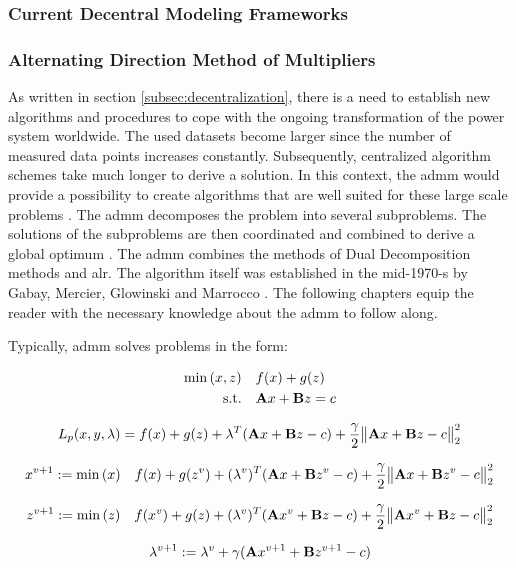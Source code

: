 \subsubsection{Current Decentral Modeling Frameworks}

\subsubsection{Alternating Direction Method of Multipliers}
As written in section \ref{subsec:decentralization}, there is a need to establish new algorithms and procedures to cope with the ongoing transformation of the power system worldwide. The used datasets become larger since the number of measured data points increases constantly. Subsequently, centralized algorithm schemes take much longer to derive a solution. In this context, the \gls{admm} would provide a possibility to create algorithms that are well suited for these large scale problems \citep{boyd2010}. The \gls{admm} decomposes the problem into several subproblems. The solutions of the subproblems are then coordinated and combined to derive a global optimum \citep{boyd2010}. The \gls{admm} combines the methods of Dual Decomposition methods and \gls{alr}. The algorithm itself was established in the mid-1970-s by Gabay, Mercier, Glowinski and Marrocco \citep{boyd2010}. The following chapters equip the reader with the necessary knowledge about the \gls{admm} to follow along.

Typically, \gls{admm} solves problems in the form:

\begin{subequations}
	\begin{align}
		\min{(x, z)} \quad & f(x) + g(z) \\
		\text{s.t.} \quad & \vb{A}x + \vb{B}z = c
	\end{align}
\end{subequations}

\begin{equation}
	L_p(x,y, \lambda) = f(x) + g(z) + \lambda^T(\vb{A}x + \vb{B}z - c) + \frac{\gamma}{2}\big\| \vb{A}x + \vb{B}z - c \big\|^2_2 
\end{equation}


\begin{equation}
	x^{v+1} := \min{(x)} \quad f(x) + g(z^{v}) + (\lambda^v)^T(\vb{A}x + \vb{B}z^v - c) + \frac{\gamma}{2}\big\| \vb{A}x + \vb{B}z^v - c \big\|^2_2 
\end{equation}

\begin{equation}
	z^{v+1} := \min{(z)} \quad f(x^v) + g(z) + (\lambda^v)^T(\vb{A}x^v + \vb{B}z - c) + \frac{\gamma}{2}\big\| \vb{A}x^v + \vb{B}z - c \big\|^2_2 
\end{equation}

\begin{equation}
	\lambda^{v+1} :=  \lambda^{v} + \gamma(\vb{A}x^{v+1} + \vb{B}z^{v+1} - c)
\end{equation}
